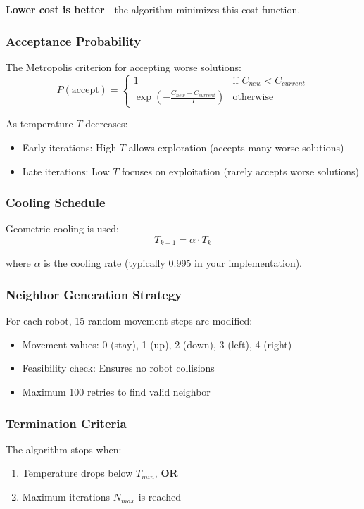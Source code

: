 \textbf{Lower cost is better} - the algorithm minimizes this cost function.

\subsubsection{Acceptance Probability}
The Metropolis criterion for accepting worse solutions:
\begin{equation}
P(\text{accept}) = \begin{cases}
1 & \text{if } C_{new} < C_{current} \\
\exp\left(-\frac{C_{new} - C_{current}}{T}\right) & \text{otherwise}
\end{cases}
\end{equation}

As temperature $T$ decreases:
\begin{itemize}
    \item Early iterations: High $T$ allows exploration (accepts many worse solutions)
    \item Late iterations: Low $T$ focuses on exploitation (rarely accepts worse solutions)
\end{itemize}

\subsubsection{Cooling Schedule}
Geometric cooling is used:
\begin{equation}
T_{k+1} = \alpha \cdot T_k
\end{equation}

where $\alpha$ is the cooling rate (typically 0.995 in your implementation).

\subsubsection{Neighbor Generation Strategy}
For each robot, 15 random movement steps are modified:
\begin{itemize}
    \item Movement values: 0 (stay), 1 (up), 2 (down), 3 (left), 4 (right)
    \item Feasibility check: Ensures no robot collisions
    \item Maximum 100 retries to find valid neighbor
\end{itemize}

\subsubsection{Termination Criteria}
The algorithm stops when:
\begin{enumerate}
    \item Temperature drops below $T_{min}$, \textbf{OR}
    \item Maximum iterations $N_{max}$ is reached
\end{enumerate}

